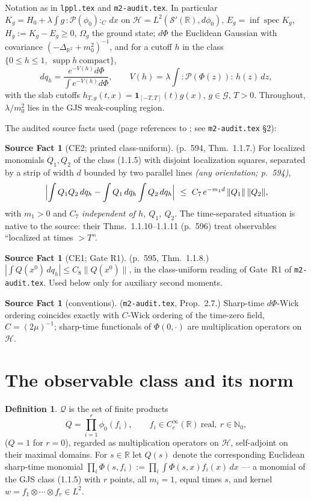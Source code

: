 \documentclass[11pt,a4paper]{article}
\theoremstyle{plain}
\theoremstyle{definition}
\newtheorem{definition}[theorem]{Definition}
\newtheorem{srcfact}[theorem]{Source Fact}
\newcommand{\R}{\mathbb{R}}
\newcommand{\Om}{\Omega}
\newcommand{\G}{\mathcal{G}}
\newcommand{\Q}{\mathcal{Q}}
\newcommand{\HH}{\mathcal{H}}
\DeclareMathOperator{\supp}{supp}
\DeclareMathOperator{\spec}{spec}
\begin{document}
Notation as in \texttt{lppl.tex} and \texttt{m2-audit.tex}. In particular
$K_g=H_0+\lambda\int g\,{:}\mathscr P(\phi_0){:}_C\,dx$ on $\HH=L^2(\mathcal S'(\R),d\phi_0)$,
$E_g=\inf\spec K_g$, $H_g:=K_g-E_g\ge0$, $\Om_g$ the ground state; $d\Phi$ the Euclidean Gaussian
with covariance $(-\Delta_{\R^2}+m_0^2)^{-1}$, and for a cutoff $h$ in the class
$\{0\le h\le1,\ \supp h\ \text{compact}\}$,
\[
  dq_h=\frac{e^{-V(h)}d\Phi}{\int e^{-V(h)}d\Phi},\qquad
  V(h)=\lambda\int{:}\mathscr P(\Phi(z)){:}\,h(z)\,dz ,
\]
with the slab cutoffs $h_{T,g}(t,x)=\mathbf 1_{[-T,T]}(t)g(x)$, $g\in\G$, $T>0$. Throughout,
$\lambda/m_0^2$ lies in the GJS weak-coupling region.

The audited source facts used (page references to \cite{GJS}; see \texttt{m2-audit.tex} \S2):

\begin{srcfact}[CE2; printed class-uniform]\label{sf:CE2}
(p.~594, Thm.~1.1.7.) For localized monomials $Q_1,Q_2$ of the class (1.1.5) with disjoint
localization squares, separated by a strip of width $d$ bounded by two parallel lines
\emph{(any orientation; p.~594)},
\[
  \Bigl|\int Q_1Q_2\,dq_h-\int Q_1\,dq_h\int Q_2\,dq_h\Bigr|
  \ \le\ C_7\,e^{-m_1 d}\,\|Q_1\|\,\|Q_2\|,
\]
with $m_1>0$ and $C_7$ \emph{independent of $h$, $Q_1$, $Q_2$}. The time-separated situation is
native to the source: their Thms.~1.1.10--1.1.11 (p.~596) treat observables ``localized at times
$>T$''.
\end{srcfact}

\begin{srcfact}[CE1; Gate R1]\label{sf:CE1}
(p.~595, Thm.~1.1.8.) $|\int Q(x^0)\,dq_h|\le C_8\|Q(x^0)\|$, in the class-uniform reading of
Gate~R1 of \texttt{m2-audit.tex}. Used below only for auxiliary second moments.
\end{srcfact}

\begin{srcfact}[conventions]\label{sf:conv}
(\texttt{m2-audit.tex}, Prop.~2.7.) Sharp-time $d\Phi$-Wick ordering coincides exactly with
$C$-Wick ordering of the time-zero field, $C=(2\mu)^{-1}$; sharp-time functionals of
$\Phi(0,\cdot)$ are multiplication operators on $\HH$.
\end{srcfact}

\section{The observable class and its norm}\label{sec:class}

\begin{definition}\label{def:class}
$\Q$ is the set of finite products
\[
  Q=\prod_{i=1}^{r}\phi_0(f_i),\qquad f_i\in C_c^\infty(\R)\ \text{real},\ r\in\mathbb N_0 ,
\]
($Q=1$ for $r=0$), regarded as multiplication operators on $\HH$, self-adjoint on their maximal
domains. For $s\in\R$ let $Q(s)$ denote the corresponding Euclidean sharp-time monomial
$\prod_i\Phi(s,f_i):=\prod_i\int\Phi(s,x)f_i(x)\,dx$ --- a monomial of the GJS class (1.1.5) with
$r$ points, all $m_i=1$, equal times $s$, and kernel $w=f_1\otimes\cdots\otimes f_r\in L^2$.
\end{definition}
\end{document}
